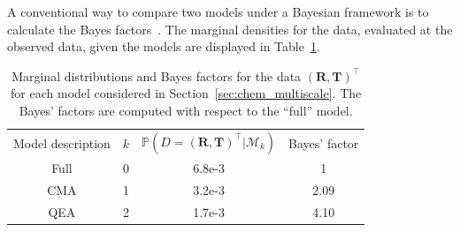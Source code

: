 \documentclass[final]{siamltex}
\begin{document}


A conventional way to compare two models under a Bayesian framework is
to calculate the Bayes factors~\cite{chen2012monte}. The marginal densities for the data, evaluated at the observed data, given the models are displayed in Table~\ref{tab:chem_Bayes_marginals}.

\begin{table}[!htb]
\centering
\begin{tabular}{cccc}
	\toprule
	Model description & $k$ & \quad $\mathbb{P}(D =
                                  (\mathbf{R},\mathbf{T})^\top|\mathcal{M}_k)$
  & Bayes' factor  \\ \cmidrule(lr){1-4}
	Full & 0 & 6.8e-3 & 1 \\
	CMA & 1 & 3.2e-3 & 2.09 \\
	QEA & 2 & 1.7e-3 & 4.10 \\ \bottomrule
\end{tabular}
\caption{Marginal distributions and Bayes factors for the data
  $(\mathbf{R},\mathbf{T})^\top$ for each model considered in
  Section~\ref{sec:chem_multiscale}. The Bayes' factors are computed
  with respect to the ``full'' model.}
\label{tab:chem_Bayes_marginals}
\end{table}
\end{document}
